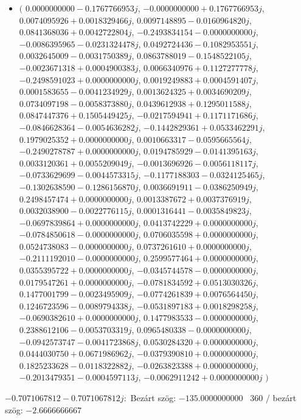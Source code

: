 \documentclass[14pt,a4paper]{article}
\begin{document}
\begin{itemize}
\item
$\big($
$0.0000000000-0.1767766953j$, $-0.0000000000+0.1767766953j$, $0.0074095926+0.0018329466j$, $0.0097148895-0.0160964820j$, $0.0841368036+0.0042722804j$, $-0.2493834154-0.0000000000j$, $-0.0086395965-0.0231324478j$, $0.0492724436-0.1082953551j$, $0.0032645009-0.0031750389j$, $0.0863788019-0.1548522105j$, $-0.0023671318+0.0004900383j$, $0.0066340976+0.1127277778j$, $-0.2498591023+0.0000000000j$, $0.0019249883+0.0004591407j$, $0.0001583655-0.0041234929j$, $0.0013624325+0.0034690209j$, $0.0734097198-0.0058373880j$, $0.0439612938+0.1295011588j$, $0.0847447376+0.1505449425j$, $-0.0217594941+0.1171171686j$, $-0.0846628364-0.0054636282j$, $-0.1442829361+0.0533462291j$, $0.1979025352+0.0000000000j$, $0.0010663317-0.0595665564j$, $-0.2490278787+0.0000000000j$, $0.0194785929-0.0141395163j$, $0.0033120361+0.0055209049j$, $-0.0013696926-0.0056118117j$, $-0.0733629699-0.0044573315j$, $-0.1177188303-0.0324125465j$, $-0.1302638590-0.1286156870j$, $0.0036691911-0.0386250949j$, $0.2498457474+0.0000000000j$, $0.0013387672+0.0037376919j$, $0.0032038900-0.0022776115j$, $0.0001316441-0.0035849823j$, $-0.0697839864+0.0000000000j$, $0.0413742229+0.0000000000j$, $-0.0784850618-0.0000000000j$, $0.0706035598+0.0000000000j$, $0.0524738083-0.0000000000j$, $0.0737261610+0.0000000000j$, $-0.2111192010-0.0000000000j$, $0.2599577464+0.0000000000j$, $0.0355395722+0.0000000000j$, $-0.0345744578-0.0000000000j$, $0.0179547261+0.0000000000j$, $-0.0781834592+0.0513030326j$, $0.1477001799-0.0023495909j$, $-0.0774261839+0.0076564450j$, $0.1246723596-0.0089794338j$, $-0.0531897183+0.0018298258j$, $-0.0690382610+0.0000000000j$, $0.1477983533-0.0000000000j$, $0.2388612106-0.0053703319j$, $0.0965480338-0.0000000000j$, $-0.0942573747-0.0041723868j$, $0.0530284320+0.0000000000j$, $0.0444030750+0.0671986962j$, $-0.0379390810+0.0000000000j$, $0.1825233628-0.0118322882j$, $-0.0263823388+0.0000000000j$, $-0.2013479351-0.0004597113j$, $-0.0062911242+0.0000000000j$
$\big)$
\end{itemize}
$-0.7071067812-0.7071067812j$:\
Bezárt szög: $-135.0000000000$ \
360 / bezárt szög: $-2.6666666667$\
\end{document}

